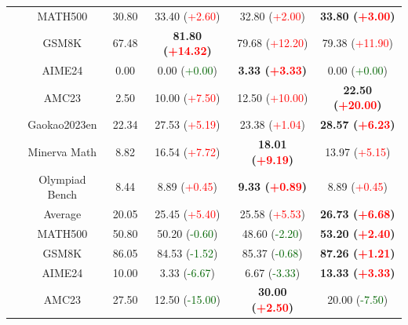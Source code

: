\begin{table}[t]
\begin{subtable}{\linewidth}
\begin{tabular}{c||c|cccc}
             &  MATH500 & 30.80 & 33.40 (\textcolor{red}{+2.60}) & 32.80 (\textcolor{red}{+2.00}) & \textbf{33.80 (\textcolor{red}{+3.00})} \\
    &  GSM8K & 67.48 & \textbf{81.80 (\textcolor{red}{+14.32})} & 79.68 (\textcolor{red}{+12.20}) & 79.38 (\textcolor{red}{+11.90}) \\
    &  AIME24 & 0.00 & 0.00 (\textcolor{DarkGreen}{+0.00}) & \textbf{3.33 (\textcolor{red}{+3.33})} & 0.00 (\textcolor{DarkGreen}{+0.00}) \\
    &  AMC23 & 2.50 & 10.00 (\textcolor{red}{+7.50}) & 12.50 (\textcolor{red}{+10.00}) & \textbf{22.50 (\textcolor{red}{+20.00})} \\
    &  Gaokao2023en & 22.34 & 27.53 (\textcolor{red}{+5.19}) & 23.38 (\textcolor{red}{+1.04}) & \textbf{28.57 (\textcolor{red}{+6.23})} \\
    &  Minerva Math & 8.82 & 16.54 (\textcolor{red}{+7.72}) & \textbf{18.01 (\textcolor{red}{+9.19})} & 13.97 (\textcolor{red}{+5.15}) \\
    &  Olympiad Bench & 8.44 & 8.89 (\textcolor{red}{+0.45}) & \textbf{9.33 (\textcolor{red}{+0.89})} & 8.89 (\textcolor{red}{+0.45}) \\
    & Average & 20.05 & 25.45 (\textcolor{red}{+5.40}) & 25.58 (\textcolor{red}{+5.53}) & \textbf{26.73 (\textcolor{red}{+6.68})} \\
            \toprule
            &  MATH500 & 50.80 & 50.20 (\textcolor{DarkGreen}{-0.60}) & 48.60 (\textcolor{DarkGreen}{-2.20}) & \textbf{53.20 (\textcolor{red}{+2.40})} \\
    &  GSM8K & 86.05 & 84.53 (\textcolor{DarkGreen}{-1.52}) & 85.37 (\textcolor{DarkGreen}{-0.68}) & \textbf{87.26 (\textcolor{red}{+1.21})} \\
    &  AIME24 & 10.00 & 3.33 (\textcolor{DarkGreen}{-6.67}) & 6.67 (\textcolor{DarkGreen}{-3.33}) & \textbf{13.33 (\textcolor{red}{+3.33})} \\
    &  AMC23 & 27.50 & 12.50 (\textcolor{DarkGreen}{-15.00}) & \textbf{30.00 (\textcolor{red}{+2.50})} & 20.00 (\textcolor{DarkGreen}{-7.50}) \\

\end{tabular}
\end{subtable}
\end{table}
